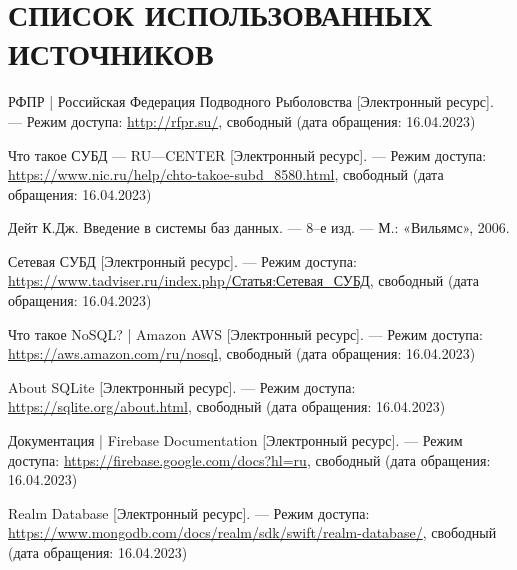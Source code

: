 \section*{СПИСОК ИСПОЛЬЗОВАННЫХ ИСТОЧНИКОВ}

\begingroup
\renewcommand{\section}[2]{}
\begin{thebibliography}{}
	
	РФПР | Российская Федерация Подводного Рыболовства [Электронный ресурс]. --- Режим доступа: \url{http://rfpr.su/}, свободный (дата обращения: 16.04.2023)
	
	Что такое СУБД --- RU---CENTER [Электронный ресурс]. --- Режим доступа: \url{https://www.nic.ru/help/chto-takoe-subd_8580.html}, свободный (дата обращения: 16.04.2023)
	
	Дейт К.Дж. Введение в системы баз данных. --- 8--е изд. --- М.: «Вильямс», 2006.
	
	Сетевая СУБД [Электронный ресурс]. --- Режим доступа: \url{https://www.tadviser.ru/index.php/Статья:Сетевая_СУБД}, свободный (дата обращения: 16.04.2023)
	
	
	
	Что такое NoSQL? | Amazon AWS  [Электронный ресурс]. --- Режим доступа: \url{https://aws.amazon.com/ru/nosql}, свободный (дата обращения: 16.04.2023)
		
	About SQLite  [Электронный ресурс]. --- Режим доступа: \url{https://sqlite.org/about.html}, свободный (дата обращения: 16.04.2023)
	
	Документация | Firebase Documentation [Электронный ресурс]. --- Режим доступа: \url{https://firebase.google.com/docs?hl=ru}, свободный (дата обращения: 16.04.2023)
	
	Realm Database [Электронный ресурс]. --- Режим доступа: \url{https://www.mongodb.com/docs/realm/sdk/swift/realm-database/}, свободный (дата обращения: 16.04.2023)
	 

\end{thebibliography}
